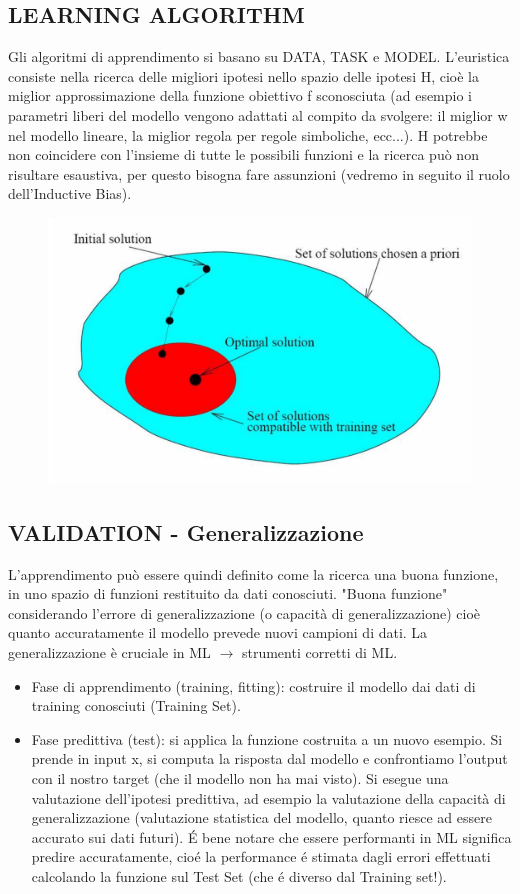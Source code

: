 \documentclass{article}
\begin{document}
\subsection{LEARNING ALGORITHM}
Gli algoritmi di apprendimento si basano su DATA, TASK e MODEL. L'euristica consiste nella ricerca delle migliori ipotesi nello spazio delle ipotesi H, cioè la miglior approssimazione della funzione obiettivo f sconosciuta (ad esempio i parametri liberi del modello vengono adattati al compito da svolgere: il miglior w nel modello lineare, la miglior regola per regole simboliche, ecc...). H potrebbe non coincidere con l'insieme di tutte le possibili funzioni e la ricerca può non risultare esaustiva, per questo bisogna fare assunzioni (vedremo in seguito il ruolo dell'Inductive Bias).
\begin{figure}[H]
    \centering
    \includegraphics[scale=0.4]{Images/learningalgo.png}
\end{figure}

\subsection{VALIDATION - Generalizzazione}
L'apprendimento può essere quindi definito come la ricerca una buona funzione, in uno spazio di funzioni restituito da dati conosciuti. "Buona funzione" considerando l'errore di generalizzazione (o capacità di generalizzazione) cioè quanto accuratamente il modello prevede nuovi campioni di dati. La generalizzazione è cruciale in ML $\rightarrow$ strumenti corretti di ML.
\begin{itemize}
    \item Fase di apprendimento (training, fitting): costruire il modello dai dati di training conosciuti (Training Set).
    \item Fase predittiva (test): si applica la funzione costruita a un nuovo esempio. Si prende in input x, si computa la risposta dal modello e confrontiamo l'output con il nostro target (che il modello non ha mai visto). Si esegue una valutazione dell'ipotesi predittiva, ad esempio la valutazione della capacità di generalizzazione (valutazione statistica del modello, quanto riesce ad essere accurato sui dati futuri). É bene notare che essere performanti in ML significa predire accuratamente, cioé la performance é stimata dagli errori effettuati calcolando la funzione sul Test Set (che é diverso dal Training set!).
\end{itemize}
\end{document}
